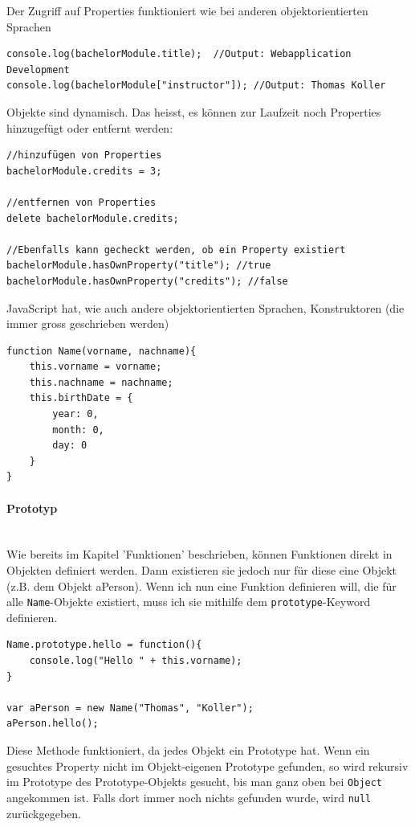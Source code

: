 \documentclass[a4paper, 11pt]{article}
\newcommand{\code}[1]{\texttt{#1}}
\begin{document}
Der Zugriff auf Properties funktioniert wie bei anderen objektorientierten Sprachen

\begin{lstlisting}
console.log(bachelorModule.title);  //Output: Webapplication Development
console.log(bachelorModule["instructor"]); //Output: Thomas Koller
\end{lstlisting}

Objekte sind dynamisch. Das heisst, es können zur Laufzeit noch Properties hinzugefügt oder entfernt werden:

\begin{lstlisting}
//hinzufügen von Properties
bachelorModule.credits = 3;

//entfernen von Properties
delete bachelorModule.credits;

//Ebenfalls kann gecheckt werden, ob ein Property existiert
bachelorModule.hasOwnProperty("title"); //true
bachelorModule.hasOwnProperty("credits"); //false
\end{lstlisting}

JavaScript hat, wie auch andere objektorientierten Sprachen, Konstruktoren (die immer gross geschrieben werden)

\begin{lstlisting}
function Name(vorname, nachname){
	this.vorname = vorname;
	this.nachname = nachname;
	this.birthDate = {
		year: 0,
		month: 0,
		day: 0
	}
}
\end{lstlisting}

\paragraph{Prototyp}\mbox{}\\

Wie bereits im Kapitel 'Funktionen' beschrieben, können Funktionen direkt in Objekten definiert werden. Dann existieren sie jedoch nur für diese eine Objekt (z.B. dem Objekt aPerson). Wenn ich nun eine Funktion definieren will, die für alle \code{Name}-Objekte existiert, muss ich sie mithilfe dem \code{prototype}-Keyword definieren.

\begin{lstlisting}
Name.prototype.hello = function(){
	console.log("Hello " + this.vorname); 
}

var aPerson = new Name("Thomas", "Koller");
aPerson.hello();
\end{lstlisting}

Diese Methode funktioniert, da jedes Objekt ein Prototype hat. Wenn ein gesuchtes Property nicht im Objekt-eigenen Prototype gefunden, so wird rekursiv im Prototype des Prototype-Objekts gesucht, bis man ganz oben bei \code{Object} angekommen ist. Falls dort immer noch nichts gefunden wurde, wird \code{null} zurückgegeben. 
\end{document}
